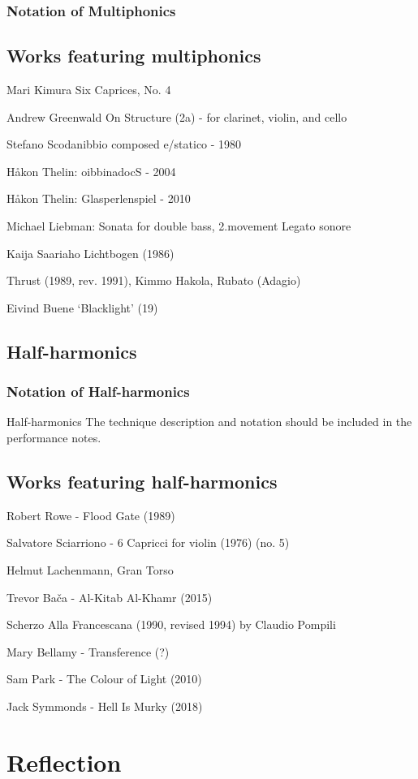 \subsubsection{Notation of Multiphonics}

\subsection{Works featuring multiphonics}

Mari Kimura Six Caprices, No. 4 

Andrew Greenwald On Structure (2a) - for clarinet, violin, and cello

Stefano Scodanibbio composed e/statico - 1980

Håkon Thelin: oibbinadocS - 2004

Håkon Thelin: Glasperlenspiel - 2010

Michael Liebman: Sonata for double bass, 2.movement Legato sonore


Kaija Saariaho Lichtbogen (1986)

Thrust (1989, rev. 1991),  Kimmo Hakola, Rubato (Adagio) 

Eivind Buene `Blacklight' (19)



\subsection{Half-harmonics}

\subsubsection{Notation of Half-harmonics}
Half-harmonics 
The technique description and notation should be included in the performance notes.


\subsection{Works featuring half-harmonics}

Robert Rowe - Flood Gate (1989)

Salvatore Sciarriono - 6 Capricci for violin (1976) (no. 5)

Helmut Lachenmann, Gran Torso

Trevor Bača - Al-Kitab Al-Khamr (2015)

Scherzo Alla Francescana (1990, revised 1994) by Claudio Pompili 

Mary Bellamy - Transference (?)

Sam Park - The Colour of Light (2010)

Jack Symmonds - Hell Is Murky (2018)

\section{Reflection}




\lipsum[4]